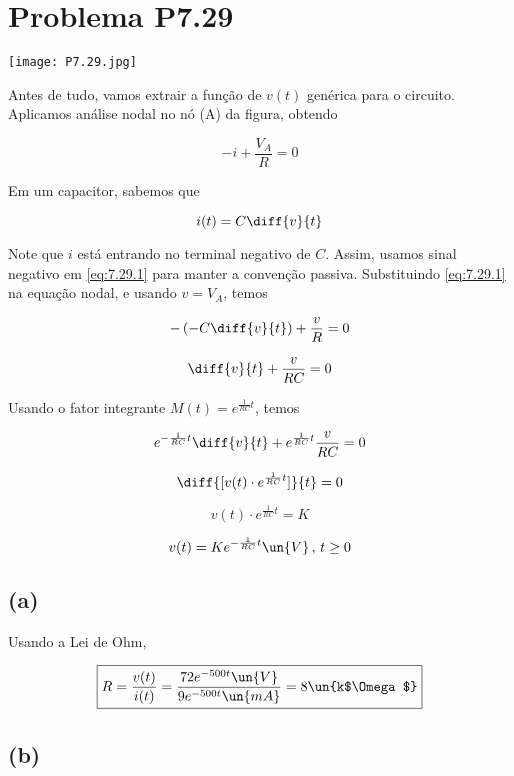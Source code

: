 
\section*{Problema P7.29}

\renewcommand*\thesection{7.29}

\begin{center}
    \texttt{[image: P7.29.jpg]}
\end{center}

Antes de tudo, vamos extrair a função de $v(t)$ genérica para o circuito. 
Aplicamos análise nodal no nó (A) da figura, obtendo    

\[ -i + \frac{V_A}{R} = 0 \]

Em um capacitor, sabemos que 

\begin{equation}\label{eq:7.29.1}
    i(t) = C\diff{v}{t}
\end{equation}

Note que $i$ está entrando no terminal negativo de $C$. Assim, usamos sinal negativo em \eqref{eq:7.29.1} para manter a 
convenção passiva. Substituindo \eqref{eq:7.29.1} na equação nodal, e usando $v = V_A$, temos   

\[ -\left(-C\diff{v}{t}\right) + \frac{v}{R} = 0 \]

\[ \diff{v}{t} + \frac{v}{RC} = 0 \]

Usando o fator integrante $M(t) = e^{\frac{1}{RC}t}$, temos   

\[ e^{-\frac{1}{RC}t}\diff{v}{t} + e^{\frac{1}{RC}t}\frac{v}{RC} = 0 \]

\[ \diff{[v(t) \cdot e^{\frac{1}{RC}t}]}{t} = 0 \]

\[ v(t) \cdot e^{\frac{1}{RC}t} = K \]

\begin{equation}\label{eq:7.29.2}
    v(t) = Ke^{-\frac{1}{RC}t} \un{V} \, , \, t \geq 0
\end{equation}

\subsection*{(a)}

Usando a Lei de Ohm,  

\[ \boxed{R = \frac{v(t)}{i(t)} = \frac{72e^{-500t} \un{V}}{9e^{-500t} \un{mA}} = 8\un{k$\Omega$}}  \]

\subsection*{(b)}

